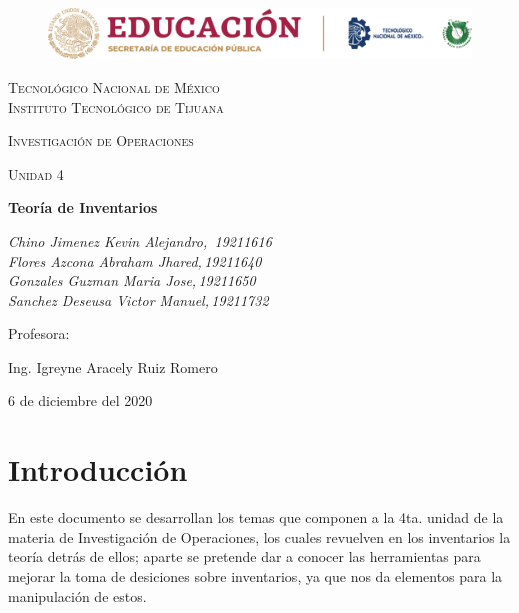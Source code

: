 \documentclass[letterpaper, 12pt]{article}
\begin{document}
    
    \begin{titlepage}
        \begin{figure}[ht]
            \centering
            \includegraphics[width=15cm]{logosITT.png}
        \end{figure}
        \centering
        {\scshape\LARGE Tecnológico Nacional de México\\Instituto Tecnológico de Tijuana\par}
        \vspace{1cm}
        {\scshape\Large Investigación de Operaciones\par}
        \vspace{1cm}
        {\scshape\Large Unidad 4\par}
        \vspace{1.5cm}
        {\huge\bfseries Teoría de Inventarios\par}
        \vspace{2cm}
        {\Large\itshape Chino Jimenez Kevin Alejandro,\, 19211616\\Flores Azcona Abraham Jhared,\,19211640\\Gonzales Guzman Maria Jose,\,19211650\\Sanchez Deseusa Victor Manuel,\,19211732\par}
        \vfill
        Profesora: \par
        Ing. Igreyne Aracely Ruiz Romero
        
        \vfill

        {\large 6 de diciembre del 2020}
    \end{titlepage}

    \newpage
    \thispagestyle{empty}
    \tableofcontents
    \listoffigures

    \newpage
    \section*{Introducción}
    \justify
    En este documento se desarrollan los temas que componen a la 4ta. unidad de la materia de Investigación de Operaciones, los cuales revuelven
    en los inventarios  la teoría detrás de ellos; aparte se pretende dar a conocer las herramientas para mejorar la toma de desiciones sobre inventarios,
    ya que nos da elementos para la manipulación de estos.
\end{document}
